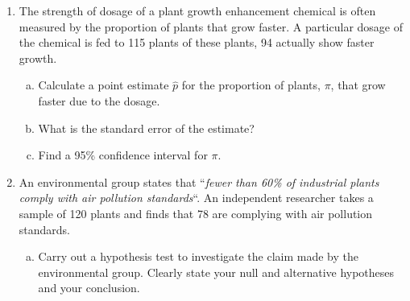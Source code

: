\documentclass[a4paper,12pt]{article}
\begin{document}
\large
\begin{enumerate}

\item 
The strength of dosage of a plant growth enhancement chemical is often measured by the proportion of plants that grow faster. A particular dosage of the chemical is fed to 115 plants of these plants, 94 actually show faster growth.

\begin{enumerate}[(a)]
\item  Calculate a point estimate $\hat{p}$ for the proportion of plants, $\pi$, that grow faster due to the dosage. 									 
\item  What is the standard error of the estimate? 			
\item  Find a 95\% confidence interval for $\pi$. 				
\end{enumerate}



 \item An environmental group states that ``\textit{fewer than 60\% of industrial plants comply with air pollution standards}``. An independent researcher takes a sample of 120 plants and finds that 78 are complying with air pollution standards. 


 \begin{enumerate}[(a)]
 \item  Carry out a hypothesis test to investigate the claim made by the environmental group. Clearly state your null and alternative hypotheses and your conclusion.
 \end{enumerate}
 

\end{enumerate}
\end{document}
